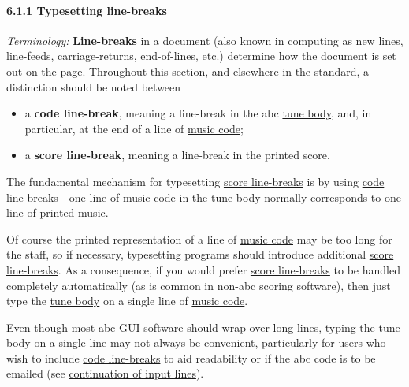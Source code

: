 \hypertarget{typesetting_line-breaks}{\paragraph{6.1.1 Typesetting
line-breaks}\label{typesetting_line-breaks}}

\emph{Terminology:} \textbf{Line-breaks} in a document (also known in
computing as new lines, line-feeds, carriage-returns, end-of-lines,
etc.) determine how the document is set out on the page. Throughout this
section, and elsewhere in the standard, a distinction should be noted
between

\begin{itemize}
\item
  \href{}{}a \textbf{code line-break}, meaning a line-break in the abc
  \protect\hyperlink{tune_body_definition}{tune body}, and, in
  particular, at the end of a line of
  \protect\hyperlink{music_code_definition}{music code};
\item
  \href{}{}a \textbf{score line-break}, meaning a line-break in the
  printed score.
\end{itemize}

The fundamental mechanism for typesetting
\protect\hyperlink{score_line-break_definition}{score line-breaks} is by
using \protect\hyperlink{code_line-break_definition}{code line-breaks} -
one line of \protect\hyperlink{music_code_definition}{music code} in the
\protect\hyperlink{tune_body_definition}{tune body} normally corresponds
to one line of printed music.

Of course the printed representation of a line of
\protect\hyperlink{music_code_definition}{music code} may be too long
for the staff, so if necessary, typesetting programs should introduce
additional \protect\hyperlink{score_line-break_definition}{score
line-breaks}. As a consequence, if you would prefer
\protect\hyperlink{score_line-break_definition}{score line-breaks} to be
handled completely automatically (as is common in non-abc scoring
software), then just type the
\protect\hyperlink{tune_body_definition}{tune body} on a single line of
\protect\hyperlink{music_code_definition}{music code}.

Even though most abc GUI software should wrap over-long lines, typing
the \protect\hyperlink{tune_body_definition}{tune body} on a single line
may not always be convenient, particularly for users who wish to include
\protect\hyperlink{code_line-break_definition}{code line-breaks} to aid
readability or if the abc code is to be emailed (see
\protect\hyperlink{continuation_of_input_lines}{continuation of input
lines}).

